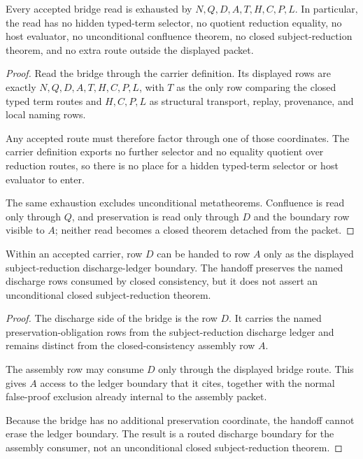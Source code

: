 \begin{theorem}
\label{thm:metacic-normalization-confluence-bridge-route-exactness}
Every accepted \MetacicNormalizationConfluenceBridgeUp{} bridge read is exhausted by $N,Q,D,A,T,H,C,P,L$. In particular, the read has no hidden typed-term selector, no quotient reduction equality, no host evaluator, no unconditional confluence theorem, no closed subject-reduction theorem, and no extra route outside the displayed packet.
\end{theorem}
\begin{proof}
Read the bridge through the carrier definition. Its displayed rows are exactly $N,Q,D,A,T,H,C,P,L$, with $T$ as the only row comparing the closed typed term routes and $H,C,P,L$ as structural transport, replay, provenance, and local naming rows.

Any accepted route must therefore factor through one of those coordinates. The carrier definition exports no further selector and no equality quotient over reduction routes, so there is no place for a hidden typed-term selector or host evaluator to enter.

The same exhaustion excludes unconditional metatheorems. Confluence is read only through $Q$, and preservation is read only through $D$ and the boundary row visible to $A$; neither read becomes a closed theorem detached from the packet.
\end{proof}

\begin{theorem}
\label{thm:metacic-normalization-confluence-bridge-discharge-boundary}
Within an accepted \MetacicNormalizationConfluenceBridgeUp{} carrier, row $D$ can be handed to row $A$ only as the displayed subject-reduction discharge-ledger boundary. The handoff preserves the named discharge rows consumed by closed consistency, but it does not assert an unconditional closed subject-reduction theorem.
\end{theorem}
\begin{proof}
The discharge side of the bridge is the row $D$. It carries the named preservation-obligation rows from the subject-reduction discharge ledger and remains distinct from the closed-consistency assembly row $A$.

The assembly row may consume $D$ only through the displayed bridge route. This gives $A$ access to the ledger boundary that it cites, together with the normal false-proof exclusion already internal to the assembly packet.

Because the bridge has no additional preservation coordinate, the handoff cannot erase the ledger boundary. The result is a routed discharge boundary for the assembly consumer, not an unconditional closed subject-reduction theorem.
\end{proof}

